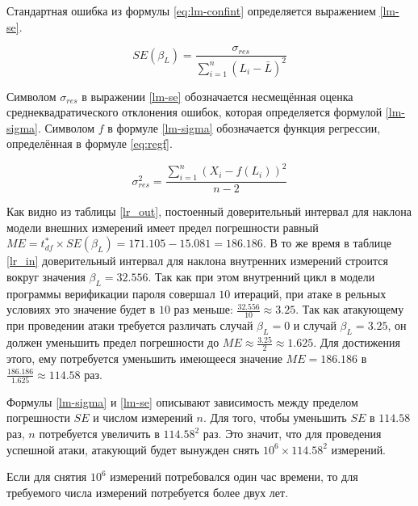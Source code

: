 Стандартная ошибка из формулы \ref{eq:lm-confint} определяется выражением \ref{lm-se}.

\nopagebreak

\begin{equation} \label{lm-se}
SE(\beta_L) = \frac{ \sigma_{res} }{ \sum^n_{i=1} (L_i - \bar{L})^2 }
\end{equation}

Символом $\sigma_{res}$ в выражении \ref{lm-se} обозначается несмещённая оценка среднеквадратического отклонения
ошибок, которая определяется формулой \ref{lm-sigma}. Символом $f$ в формуле \ref{lm-sigma}
обозначается функция регрессии, определённая в формуле \ref{eq:regf}.

\begin{equation} \label{lm-sigma}
\sigma_{res}^2 = \frac{ \sum^n_{i=1}  (X_i - f(L_i))^2 }{ n - 2 }
\end{equation}

Как видно из таблицы \ref{lr_out}, постоенный доверительный интервал для
наклона модели внешних измерений имеет предел погрешности равный
$ME = t^{*}_{df} \times SE(\beta_L) = 171.105 - 15.081 = 186.186$.
В то же время в таблице
\ref{lr_in} доверительный интервал для наклона внутренних измерений
строится вокруг значения $\beta_L = 32.556$. Так как при этом внутренний цикл в
модели программы верификации пароля совершал $10$ итераций, при атаке
в рельных условиях это значение будет в $10$ раз меньше:
$\frac{32.556}{10} \approx 3.25 $. Так как атакующему при проведении атаки
требуется различать случай $\beta_L = 0$ и случай $\beta_L = 3.25$,
он должен уменьшить предел погрешности до $ME \approx \frac{3.25}{2} \approx 1.625$.
Для достижения этого, ему потребуется уменьшить имеющееся значение $ME = 186.186$
в $\frac{186.186}{1.625} \approx 114.58$ раз.

Формулы \ref{lm-sigma} и \ref{lm-se} описывают зависимость между пределом
погрешности $SE$ и числом измерений $n$. Для того, чтобы уменьшить $SE$
в $114.58$ раз, $n$ потребуется увеличить в $114.58^2$ раз. Это значит,
что для проведения успешной атаки, атакующий будет вынужден снять
$10^6 \times 114.58^2$ измерений.

Если для снятия $10^6$
измерений потребовался один час времени, то для требуемого числа измерений
потребуется более двух лет.

\clearpage
